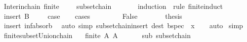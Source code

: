 \begin{isabellebody}
\endisatagproof
{\isafoldproof}%
%
\isadelimproof
\isanewline
%
\endisadelimproof
\isanewline
{}\isamarkupfalse%
\ Inter{\isacharunderscore}{\kern0pt}in{\isacharunderscore}{\kern0pt}chain{\isacharcolon}{\kern0pt}\ {\isachardoublequoteopen}{\isasymlbrakk}finite\ {\isasymB}{\isacharsemicolon}{\kern0pt}\ {\isasymB}\ {\isasymnoteq}\ {\isacharbraceleft}{\kern0pt}{\isacharbraceright}{\kern0pt}{\isacharsemicolon}{\kern0pt}\ subset{\isachardot}{\kern0pt}chain\ {\isasymA}\ {\isasymB}{\isasymrbrakk}\ {\isasymLongrightarrow}\ {\isasymInter}{\isasymB}\ {\isasymin}\ {\isasymB}{\isachardoublequoteclose}\isanewline
%
\isadelimproof
%
\endisadelimproof
%
\isatagproof
{}\isamarkupfalse%
\ {\isacharparenleft}{\kern0pt}induction\ {\isasymB}\ rule{\isacharcolon}{\kern0pt}\ finite{\isacharunderscore}{\kern0pt}induct{\isacharparenright}{\kern0pt}\isanewline
\ \ \isamarkupfalse%
\ {\isacharparenleft}{\kern0pt}insert\ B\ {\isasymB}{\isacharparenright}{\kern0pt}\isanewline
\ \ \isamarkupfalse%
\ {\isacharquery}{\kern0pt}case\isanewline
\ \ \isamarkupfalse%
\ {\isacharparenleft}{\kern0pt}cases\ {\isachardoublequoteopen}{\isasymB}\ {\isacharequal}{\kern0pt}\ {\isacharbraceleft}{\kern0pt}{\isacharbraceright}{\kern0pt}{\isachardoublequoteclose}{\isacharparenright}{\kern0pt}\isanewline
\ \ \ \ \isamarkupfalse%
\ False\isanewline
\ \ \ \ \isamarkupfalse%
\ \isamarkupfalse%
\ {\isacharquery}{\kern0pt}thesis\isanewline
\ \ \ \ \ \ \isamarkupfalse%
\ insert\ inf{\isachardot}{\kern0pt}absorb{}\ \isamarkupfalse%
\ {\isacharparenleft}{\kern0pt}auto\ simp{\isacharcolon}{\kern0pt}\ subset{\isacharunderscore}{\kern0pt}chain{\isacharunderscore}{\kern0pt}insert\ dest{\isacharbang}{\kern0pt}{\isacharcolon}{\kern0pt}\ bspec\ {\isacharbrackleft}{\kern0pt}\ x{\isacharequal}{\kern0pt}{\isachardoublequoteopen}{\isasymInter}{\isasymB}{\isachardoublequoteclose}{\isacharbrackright}{\kern0pt}{\isacharparenright}{\kern0pt}\isanewline
\ \ \isamarkupfalse%
\ auto\isanewline
{}\isamarkupfalse%
\ simp%
\endisatagproof
{\isafoldproof}%
%
\isadelimproof
\isanewline
%
\endisadelimproof
\isanewline
{}\isamarkupfalse%
\ finite{\isacharunderscore}{\kern0pt}subset{\isacharunderscore}{\kern0pt}Union{\isacharunderscore}{\kern0pt}chain{\isacharcolon}{\kern0pt}\isanewline
\ \ \ {\isachardoublequoteopen}finite\ A{\isachardoublequoteclose}\ {\isachardoublequoteopen}A\ {\isasymsubseteq}\ {\isasymUnion}{\isasymB}{\isachardoublequoteclose}\ {\isachardoublequoteopen}{\isasymB}\ {\isasymnoteq}\ {\isacharbraceleft}{\kern0pt}{\isacharbraceright}{\kern0pt}{\isachardoublequoteclose}\ \ sub{\isacharcolon}{\kern0pt}\ {\isachardoublequoteopen}subset{\isachardot}{\kern0pt}chain\ {\isasymA}\ {\isasymB}{\isachardoublequoteclose}\isanewline

\end{isabellebody}
